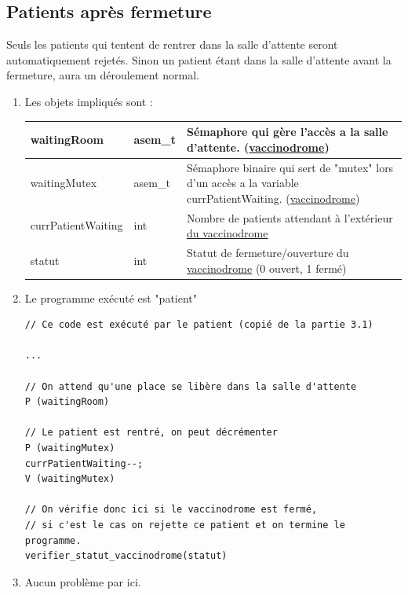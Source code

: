 \documentclass[a4paper]{article}
\begin{document}
  \subsection{Patients après fermeture}

  Seuls les patients qui tentent de rentrer dans la salle d'attente seront automatiquement rejetés.
  Sinon un patient étant dans la salle d'attente avant la fermeture, aura un déroulement normal.

  \begin{enumerate}
    \item Les objets impliqués sont :

    \begin{tabularx}{\linewidth}{|l|l|>{\strut}X|}
      \hline%
      waitingRoom & asem\_t & Sémaphore qui gère l'accès a la salle d'attente. (\underline{vaccinodrome}) \\ \hline%

      waitingMutex & asem\_t & Sémaphore binaire qui sert de "mutex" lors d'un accès a la variable currPatientWaiting. (\underline{vaccinodrome}) \\ \hline%
      currPatientWaiting & int & Nombre de patients attendant à l'extérieur \underline{du vaccinodrome} \\ \hline%
      statut & int & Statut de fermeture/ouverture du \underline{vaccinodrome} (0 ouvert, 1 fermé) \\ \hline%
    \end{tabularx}

    \item Le programme exécuté est "patient"

    \begin{verbatim}
// Ce code est exécuté par le patient (copié de la partie 3.1)

...

// On attend qu'une place se libère dans la salle d'attente
P (waitingRoom)

// Le patient est rentré, on peut décrémenter
P (waitingMutex)
currPatientWaiting--;
V (waitingMutex)

// On vérifie donc ici si le vaccinodrome est fermé,
// si c'est le cas on rejette ce patient et on termine le programme.
verifier_statut_vaccinodrome(statut)
    \end{verbatim}

    \item Aucun problème par ici.
  \end{enumerate}
  \newpage
\end{document}
